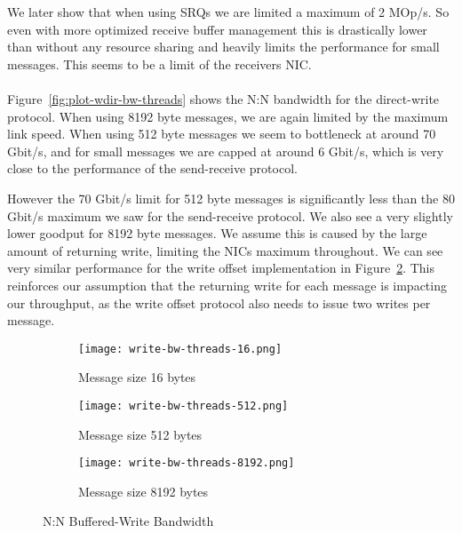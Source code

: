 We later show that when using SRQs we are limited a maximum of 2 MOp/s. So even with more optimized receive buffer management
this is drastically lower than without any resource sharing and heavily limits the performance for small messages. This seems
to be a limit of the receivers NIC.

\paragraph{} Figure~\ref{fig:plot-wdir-bw-threads} shows the N:N bandwidth for the direct-write protocol. When using 8192 
byte messages, we are again limited by the maximum link speed. When using 512 byte messages we seem to bottleneck at around 
70 Gbit/s, and for small messages we are capped at around 6 Gbit/s, which is very close to the performance of the send-receive
protocol.

However the 70 Gbit/s limit for 512 byte messages is significantly less than the 80 Gbit/s maximum we saw for the
send-receive protocol. We also see a very slightly lower goodput for 8192 byte messages. We assume this is caused by the 
large amount of returning write, limiting the NICs maximum throughout. We can see very similar performance for the
write offset implementation in Figure~\ref{fig:plot-write-bw-thread-512}. This reinforces our assumption that the returning write
for each message is impacting our throughput, as the write offset protocol also needs to issue two writes per message.




\begin{figure}[ht]
  \centering
\begin{subfigure}[b]{0.49\textwidth}
  \centering
  \texttt{[image: write-bw-threads-16.png]}
  \caption{Message size 16 bytes}
  \label{fig:plot-write-bw-thread-16}
\end{subfigure}
\begin{subfigure}[b]{0.49\textwidth}
  \centering
  \texttt{[image: write-bw-threads-512.png]}
  \caption{Message size 512 bytes}
  \label{fig:plot-write-bw-thread-512}
\end{subfigure}
\begin{subfigure}[b]{0.49\textwidth}
  \centering
  \texttt{[image: write-bw-threads-8192.png]}
  \caption{Message size 8192 bytes}
  \label{fig:plot-write-bw-thread-8192}
\end{subfigure}
  \caption{N:N Buffered-Write Bandwidth}
  \label{fig:plot-write-bw-thread}
\end{figure}


